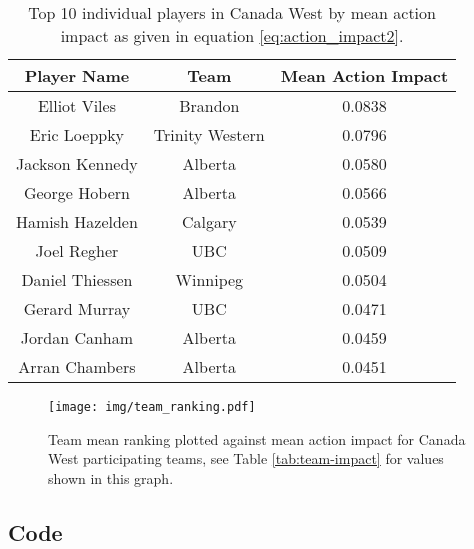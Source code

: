 \documentclass{sfuthesis}
\begin{document}
\begin{table}[]
	\centering
	\begin{tabular}{ccc}
		\textbf{Player Name} & \textbf{Team}   & \textbf{Mean Action Impact} \\ \hline
		Elliot Viles         & Brandon         & 0.0838                      \\
		Eric Loeppky         & Trinity Western & 0.0796                      \\
		Jackson Kennedy      & Alberta         & 0.0580                      \\
		George Hobern        & Alberta         & 0.0566                      \\
		Hamish Hazelden      & Calgary         & 0.0539                      \\
		Joel Regher          & UBC             & 0.0509                      \\
		Daniel Thiessen      & Winnipeg        & 0.0504                      \\
		Gerard Murray        & UBC             & 0.0471                      \\
		Jordan Canham        & Alberta         & 0.0459                      \\
		Arran Chambers       & Alberta         & 0.0451                     
	\end{tabular}
	\caption{Top 10 individual players in Canada West by mean action impact as given in equation \eqref{eq:action_impact2}.}
	\label{tab:player-impact}
\end{table}



\begin{figure}
	\texttt{[image: img/team\_ranking.pdf]}
	\caption{Team mean ranking plotted against mean action impact for Canada West participating teams, see Table \ref{tab:team-impact} for values shown in this graph.}
	\label{fig:team-impact}
\end{figure}

%
%
%
%
%

\backmatter%
	
	

\begin{appendices} %
	\chapter{Code}
\end{appendices}
\end{document}
